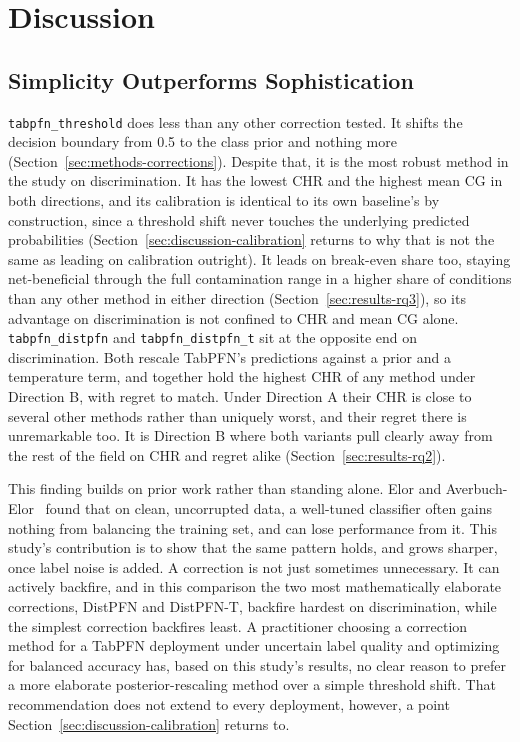 \section{Discussion}
\label{sec:discussion}

\subsection{Simplicity Outperforms Sophistication}
\label{sec:discussion-simplicity}

\texttt{tabpfn\_threshold} does less than any other correction tested. It
shifts the decision boundary from 0.5 to the class prior and nothing more
(Section~\ref{sec:methods-corrections}). Despite that, it is the most
robust method in the study on discrimination. It has the lowest CHR and
the highest mean CG in both directions, and its calibration is identical
to its own baseline's by construction, since a threshold shift never
touches the underlying predicted probabilities
(Section~\ref{sec:discussion-calibration} returns to why that is not the
same as leading on calibration outright). It leads on break-even share
too, staying net-beneficial through the full contamination range in a
higher share of conditions than any other method in either direction
(Section~\ref{sec:results-rq3}), so its advantage on discrimination is not
confined to CHR and mean CG alone. \texttt{tabpfn\_distpfn} and
\texttt{tabpfn\_distpfn\_t} sit at the opposite end on discrimination.
Both rescale TabPFN's predictions against a prior and a temperature term,
and together hold the highest CHR of any method under Direction B, with
regret to match. Under Direction A their CHR is close to several other
methods rather than uniquely worst, and their regret there is
unremarkable too. It is Direction B where both variants pull clearly
away from the rest of the field on CHR and regret alike
(Section~\ref{sec:results-rq2}).

This finding builds on prior work rather than standing alone. Elor and
Averbuch-Elor~\cite{elor2022smote} found that on clean, uncorrupted data, a
well-tuned classifier often gains nothing from balancing the training set,
and can lose performance from it. This study's contribution is to show
that the same pattern holds, and grows sharper, once label noise is added.
A correction is not just sometimes unnecessary. It can actively backfire,
and in this comparison the two most mathematically elaborate corrections,
DistPFN and DistPFN-T, backfire hardest on discrimination, while the
simplest correction backfires least. A practitioner choosing a correction
method for a TabPFN deployment under uncertain label quality and
optimizing for balanced accuracy has, based on this study's results, no
clear reason to prefer a more elaborate posterior-rescaling method over a
simple threshold shift. That recommendation does not extend to every
deployment, however, a point Section~\ref{sec:discussion-calibration}
returns to.

